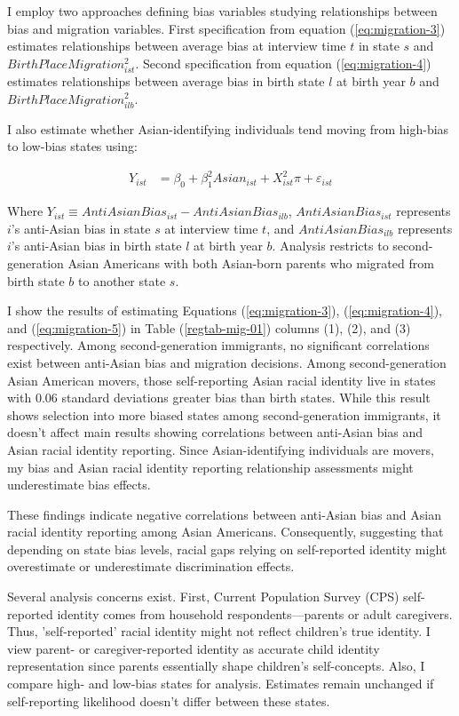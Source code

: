 I employ two approaches defining bias variables studying relationships between bias and migration variables. First specification from equation (\ref{eq:migration-3}) estimates relationships between average bias at interview time $t$ in state $s$ and $BirthPlaceMigration_{ist}^2$. Second specification from equation (\ref{eq:migration-4}) estimates relationships between average bias in birth state $l$ at birth year $b$ and $BirthPlaceMigration_{ilb}^2$.

I also estimate whether Asian-identifying individuals tend moving from high-bias to low-bias states using:

\begin{align}
Y_{ist} &= \beta_0 + \beta_1^2 Asian_{ist} +
                   X_{ist}^2\pi
                   + \varepsilon_{ist} \label{eq:migration-5}
\end{align}

Where $Y_{ist} \equiv AntiAsianBias_{ist} - AntiAsianBias_{ilb}$, $AntiAsianBias_{ist}$ represents $i$'s anti-Asian bias in state $s$ at interview time $t$, and $AntiAsianBias_{ilb}$ represents $i$'s anti-Asian bias in birth state $l$ at birth year $b$. Analysis restricts to second-generation Asian Americans with both Asian-born parents who migrated from birth state $b$ to another state $s$.

I show the results of estimating Equations (\ref{eq:migration-3}), (\ref{eq:migration-4}), and (\ref{eq:migration-5}) in Table (\ref{regtab-mig-01}) columns (1), (2), and (3) respectively. Among second-generation immigrants, no significant correlations exist between anti-Asian bias and migration decisions. Among second-generation Asian American movers, those self-reporting Asian racial identity live in states with 0.06 standard deviations greater bias than birth states. While this result shows selection into more biased states among second-generation immigrants, it doesn't affect main results showing correlations between anti-Asian bias and Asian racial identity reporting. Since Asian-identifying individuals are movers, my bias and Asian racial identity reporting relationship assessments might underestimate bias effects.

These findings indicate negative correlations between anti-Asian bias and Asian racial identity reporting among Asian Americans. Consequently, suggesting that depending on state bias levels, racial gaps relying on self-reported identity might overestimate or underestimate discrimination effects.

Several analysis concerns exist. First, Current Population Survey (CPS) self-reported identity comes from household respondents—parents or adult caregivers. Thus, 'self-reported' racial identity might not reflect children's true identity. I view parent- or caregiver-reported identity as accurate child identity representation since parents essentially shape children's self-concepts. Also, I compare high- and low-bias states for analysis. Estimates remain unchanged if self-reporting likelihood doesn't differ between these states.

